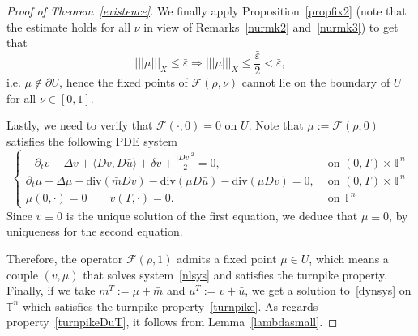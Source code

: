 \documentclass[10pt,a4paper,nouppercase,nowrite]{article}
\numberwithin{equation}{section}
\newcommand{\Sp}{{\textsc (S)} }
\newcommand{\eps}{\varepsilon}
\newcommand{\T}{\mathbb{T}}
\newcommand{\triplenorm}[1]{%
	\left\lvert\!\left\lvert\!\left\lvert #1
	\right\rvert\!\right\rvert\!\right\rvert}
\theoremstyle{definition}
\begin{document}
\begin{proof}[Proof of Theorem~\ref{existence}]
We finally apply Proposition~\ref{propfix2} (note that the estimate holds for all $\nu$ in view of Remarks~\ref{nurmk2} and~\ref{nurmk3}) to get that
$$\triplenorm{\mu}_X \le \bar{\eps} \Longrightarrow \triplenorm{\mu}_X \le \frac{\bar{\eps}}{2} < \bar \eps,$$
i.e. $\mu \not \in \partial U$, hence the fixed points of $\mathcal{F}(\rho,\nu)$ cannot lie on the boundary of $U$ for all $\nu \in [0,1]$.

\medskip

Lastly, we need to verify that $\mathcal{F}(\cdot,0)=0$ on $U$. Note that $\mu:=\mathcal{F}(\rho,0)$ satisfies the following PDE system
\begin{equation*}
	\begin{cases}
		-\partial_t v - \Delta v + \langle Dv,D\bar{u} \rangle + \delta v + \frac{|Dv|^2}{2} = 0,& \text{ on } (0,T) \times \T^n \\
		\partial_t \mu - \Delta \mu - \text{div}(\bar{m}Dv) - \text{div}(\mu D\bar{u}) - \text{div}(\mu Dv)=0,& \text{ on } (0,T) \times \T^n \\
		\mu(0,\cdot)=0 \qquad v(T,\cdot)=0.& \text{ on } \T^n
	\end{cases}
\end{equation*}
Since $v \equiv 0$ is the unique solution of the first equation, we deduce that $\mu\equiv0$, by uniqueness for the second equation.

\medskip

Therefore, the operator $\mathcal{F}(\rho,1)$ admits a fixed point $\mu \in \bar{U}$, which means a couple $(v,\mu)$ that solves system~\eqref{nlsys} and satisfies the turnpike property. \\
Finally, if we take $m^T:=\mu + \bar{m}$ and $u^T:=v+\bar{u}$, we get a solution to~\eqref{dynsys} on $\T^n$ which satisfies the turnpike property~\eqref{turnpike}. As regards property~\eqref{turnpikeDuT}, it follows from Lemma~\ref{lambdasmall}.
\end{proof}
\end{document}
